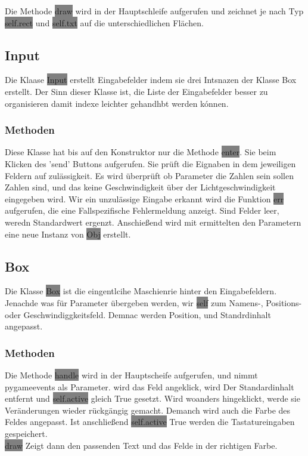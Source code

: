 \documentclass[12pt]{article}
\begin{document}
Die Methode \colorbox{gray}{draw} wird in der Hauptschleife aufgerufen und zeichnet je nach Typ \colorbox{gray}{self.rect} und \colorbox{gray}{self.txt} auf die unterschiedlichen Flächen.
\subsection{Input}
Die Klaase \colorbox{gray}{Input} erstellt Eingabefelder indem sie drei Intsnazen der Klasse Box erstellt.
Der Sinn dieser Klasse ist, die Liste der Eingabefelder besser zu organisieren damit indexe leichter gehandhbt werden kónnen.
\subsubsection{Methoden}
Diese Klasse hat bis auf den Konstruktor nur die Methode \colorbox{gray}{enter}.
Sie beim Klicken des 'send' Buttons aufgerufen.
Sie prüft die Eignaben in dem jeweiligen Feldern auf zulässigkeit.
Es wird überprüft ob Parameter die Zahlen sein sollen Zahlen sind, und das keine Geschwindigkeit über der Lichtgeschwindigkeit eingegeben wird.
Wir ein unzulässige Eingabe erkannt wird die Funktion \colorbox{gray}{err} aufgerufen, die eine Fallspezifische Fehlermeldung anzeigt.
Sind Felder leer, weredn Standardwert ergenzt.
Anschießend wird mit ermittelten den Parametern eine neue Instanz von \colorbox{gray}{Obj} erstellt.
\label{inputm}
\subsection{Box}
Die Klasse \colorbox{gray}{Box} ist die eingentlcihe Maschienrie hinter den Eingabefeldern.
Jenachde was für Parameter übergeben werden, wir \colorbox{gray}{self} zum Namens-, Positions- oder Geschwindiggkeitsfeld.
Demnac werden Position, und Standrdinhalt angepasst.
\subsubsection{Methoden}
Die Methode \colorbox{gray}{handle} wird in der Hauptscheife aufgerufen, und nimmt pygameevents als Parameter.
wird das Feld angeklick, wird Der Standardinhalt entfernt und \colorbox{gray}{self.active} gleich True gesetzt.
Wird woanders hingeklickt, werde sie Veränderungen wieder rückgängig gemacht.
Demanch wird auch die Farbe des Feldes angepasst.
Ist anschließend \colorbox{gray}{self.active} True werden die Tastatureingaben gespeichert.
\\
\colorbox{gray}{draw} Zeigt dann den passenden Text und das Felde in der richtigen Farbe.
\end{document}
